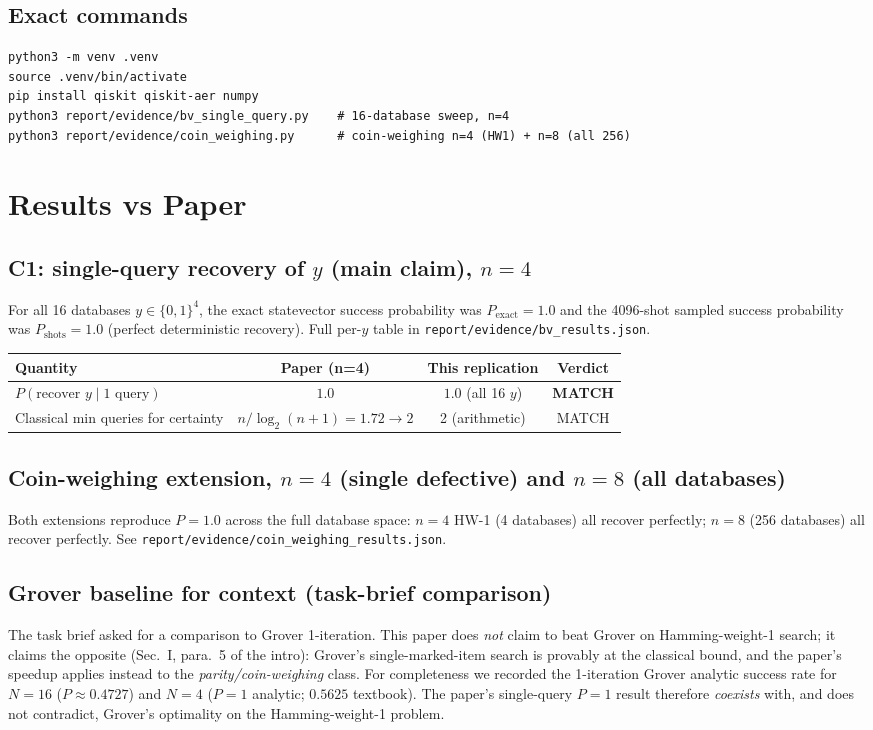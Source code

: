 \documentclass[11pt]{article}
\begin{document}
\subsection{Exact commands}
\begin{lstlisting}
python3 -m venv .venv
source .venv/bin/activate
pip install qiskit qiskit-aer numpy
python3 report/evidence/bv_single_query.py    # 16-database sweep, n=4
python3 report/evidence/coin_weighing.py      # coin-weighing n=4 (HW1) + n=8 (all 256)
\end{lstlisting}

\section{Results vs Paper}
\subsection{C1: single-query recovery of $y$ (main claim), $n=4$}
For all 16 databases $y\in\{0,1\}^4$, the exact statevector success
probability was $P_\text{exact}=1.0$ and the 4096-shot sampled success
probability was $P_\text{shots}=1.0$ (perfect deterministic recovery). Full
per-$y$ table in \verb|report/evidence/bv_results.json|.

\begin{center}
\begin{tabular}{lccc}
\toprule
Quantity & Paper (n=4) & This replication & Verdict \\
\midrule
$P(\text{recover } y \mid 1\text{ query})$ & $1.0$ & $1.0$ (all 16 $y$) & \textbf{MATCH} \\
Classical min queries for certainty & $n/\log_2(n+1) = 1.72\to 2$ & 2 (arithmetic) & MATCH \\
\bottomrule
\end{tabular}
\end{center}

\subsection{Coin-weighing extension, $n=4$ (single defective) and $n=8$ (all databases)}
Both extensions reproduce $P=1.0$ across the full database space:
$n=4$ HW-1 (4 databases) all recover perfectly; $n=8$ (256 databases) all
recover perfectly.  See \verb|report/evidence/coin_weighing_results.json|.

\subsection{Grover baseline for context (task-brief comparison)}
The task brief asked for a comparison to Grover 1-iteration. This paper does
\emph{not} claim to beat Grover on Hamming-weight-1 search; it claims the
opposite (Sec.~I, para.~5 of the intro): Grover's single-marked-item search is
provably at the classical bound, and the paper's speedup applies instead to
the \emph{parity/coin-weighing} class. For completeness we recorded the
1-iteration Grover analytic success rate for $N=16$
($P\approx 0.4727$) and $N=4$ ($P=1$ analytic; $0.5625$ textbook).
The paper's single-query $P=1$ result therefore \emph{coexists} with, and
does not contradict, Grover's optimality on the Hamming-weight-1 problem.
\end{document}
